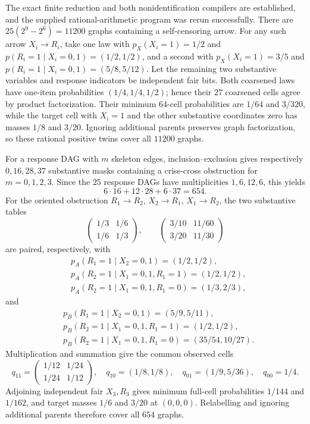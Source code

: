 The exact finite reduction and both nonidentification compilers are established, and the supplied rational-arithmetic program was rerun successfully. There are \(25(2^9-2^6)=11200\) graphs containing a self-censoring arrow. For any such arrow \(X_i\to R_i\), take one law with \(p_X(X_i=1)=1/2\) and \(p(R_i=1\mid X_i=0,1)=(1/2,1/2)\), and a second with \(p_X(X_i=1)=3/5\) and \(p(R_i=1\mid X_i=0,1)=(5/8,5/12)\). Let the remaining two substantive variables and response indicators be independent fair bits. Both coarsened laws have one-item probabilities \((1/4,1/4,1/2)\); hence their \(27\) coarsened cells agree by product factorization. Their minimum \(64\)-cell probabilities are \(1/64\) and \(3/320\), while the target cell with \(X_i=1\) and the other substantive coordinates zero has masses \(1/8\) and \(3/20\). Ignoring additional parents preserves graph factorization, so these rational positive twins cover all \(11200\) graphs.

For a response DAG with \(m\) skeleton edges, inclusion--exclusion gives respectively \(0,16,28,37\) substantive masks containing a criss-cross obstruction for \(m=0,1,2,3\). Since the \(25\) response DAGs have multiplicities \(1,6,12,6\), this yields
\[
6\cdot16+12\cdot28+6\cdot37=654.
\]
For the oriented obstruction \(R_1\to R_2\), \(X_2\to R_1\), \(X_1\to R_2\), the two substantive tables
\[
\begin{pmatrix}1/3&1/6\\1/6&1/3\end{pmatrix},\qquad
\begin{pmatrix}3/10&11/60\\3/20&11/30\end{pmatrix}
\]
are paired, respectively, with
\[
\begin{aligned}
&p_A(R_1=1\mid X_2=0,1)=(1/2,1/2),\\
&p_A(R_2=1\mid X_1=0,1,R_1=1)=(1/2,1/2),\\
&p_A(R_2=1\mid X_1=0,1,R_1=0)=(1/3,2/3),
\end{aligned}
\]
and
\[
\begin{aligned}
&p_B(R_1=1\mid X_2=0,1)=(5/9,5/11),\\
&p_B(R_2=1\mid X_1=0,1,R_1=1)=(1/2,1/2),\\
&p_B(R_2=1\mid X_1=0,1,R_1=0)=(35/54,10/27).
\end{aligned}
\]
Multiplication and summation give the common observed cells
\[
q_{11}=\begin{pmatrix}1/12&1/24\\1/24&1/12\end{pmatrix},\quad
q_{10}=(1/8,1/8),\quad q_{01}=(1/9,5/36),\quad q_{00}=1/4.
\]
Adjoining independent fair \(X_3,R_3\) gives minimum full-cell probabilities \(1/144\) and \(1/162\), and target masses \(1/6\) and \(3/20\) at \((0,0,0)\). Relabelling and ignoring additional parents therefore cover all \(654\) graphs.

